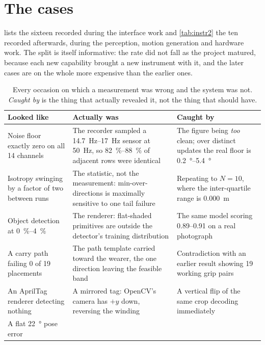 \section{The cases}

 lists the sixteen recorded during the interface work and
\cref{tab:instr2} the ten recorded afterwards, during the perception, motion
generation and hardware work. The split is itself informative: the rate did not
fall as the project matured, because each new capability brought a new
instrument with it, and the later cases are on the whole more expensive than
the earlier ones.

\begin{table}[htbp]
  \centering
  \caption{Every occasion on which a measurement was wrong and the system was
  not. \emph{Caught by} is the thing that actually revealed it, not the thing
  that should have.}
  \label{tab:instr}
  \footnotesize
  \begin{tabular}{@{}p{32mm}p{45mm}p{45mm}@{}}
    \toprule
    Looked like & Actually was & Caught by \\
    \midrule
    Noise floor exactly zero on all 14 channels
      & The recorder sampled a \SIrange{14.7}{17}{\hertz} sensor at
        \SI{50}{\hertz}, so \SIrange{82}{88}{\percent} of adjacent rows were
        identical
      & The figure being \emph{too} clean; over distinct updates the real
        floor is \SIrange{0.2}{5.4}{\degree} \\
    Isotropy swinging by a factor of two between runs
      & The statistic, not the measurement: min-over-directions is maximally
        sensitive to one tail failure
      & Repeating to $N=10$, where the inter-quartile range is
        \SI{0.000}{\metre} \\
    Object detection at \SIrange{0}{4}{\percent}
      & The renderer: flat-shaded primitives are outside the detector's
        training distribution
      & The same model scoring \numrange{0.89}{0.91} on a real photograph \\
    A carry path failing 0 of 19 placements
      & The path template carried toward the wearer, the one direction leaving
        the feasible band
      & Contradiction with an earlier result showing 19 working grip pairs \\
    An {AprilTag} renderer detecting nothing
      & A mirrored tag: {OpenCV}'s camera has $+y$ down, reversing the winding
      & A vertical flip of the same crop decoding immediately \\
    A flat \SI{22}{\degree} pose error

\end{tabular}
\end{table}

